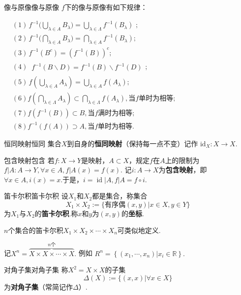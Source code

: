 \documentclass{ctexart}
\begin{document}
	\begin{命题}{像与原像}{像与原像}
		$f$下的像与原像有如下规律：\vspace{5pt}
		
		$\begin{aligned}
			&(1)\,f^{-1}\big(\bigcup_{\lambda\in A}B_\lambda\big)=\bigcup_{\lambda\in\Lambda}f^{-1}(B_\lambda)\text{ ;} \\
			&(2)\,f^{-1}\big(\bigcap_{\lambda\in A}B_\lambda\big)=\bigcap_{\lambda\in A}f^{-1}(B_\lambda); \\
			&(3)\,f^{-1}(B^{c})=(f^{-1}(B))^{c}; \\
			&(4)\,\begin{aligned}f^{-1}(B\backslash D)=f^{-1}(B)\backslash f^{-1}(D)\end{aligned}; \\
			&(5)\,f(\bigcup_{\lambda\in A}A_\lambda)=\bigcup_{\lambda\in A}f(A_\lambda);\\
			&(6)  f(\bigcap_{\lambda \in \Lambda} A_{\lambda}) \subset \bigcap_{\lambda \in \Lambda} f(A_{\lambda}) , \text{当}  f  \text{单时为相等};\\
			&(7)  f(f^{-1}(B)) \subset B , \text{当}  f  \text{满时为相等};\\
			&(8)  f^{-1}(f(A)) \supset A , \text{当}  f  \text{单时为相等}.
		\end{aligned}$
		
	\end{命题}
	\begin{定义}{恒同映射}{恒同}
		集合$X$到自身的\textbf{恒同映射}（保持每一点不变）记作 $\text{id}_X : X \rightarrow X.$
	\end{定义}
	\begin{定义}{包含映射}{包含}
		若$f:X \rightarrow Y$是映射，$A \subset X$，规定$f$在$A$上的限制为$f|A:A\to Y,\forall x\in A,f|A(x)=f(x). $ 记$i: A \rightarrow X$为\textbf{包含映射}，即$\forall x\in A,i(x)=x.$于是，$i=\operatorname{id}|A,f|A=f\circ i.$
	\end{定义}
	\begin{定义}{笛卡尔积}{笛卡尔积}
		设$X_1$和$X_2$都是集合，称集合
		$$X_1\times X_2:=\{\text{有序偶}(x,y)|x\in X,y\in Y\}$$
		为$X_1$与$X_2$的\textbf{笛卡尔积}.称$x$和$y$为$(x,y)$的\textbf{坐标}.
		
		$n$个集合的笛卡尔积$X_{1}\times X_{2}\times\cdots\times X_{n}$可类似地定义.
		
		记$X^{n}=\overbrace{X\times X\times\cdots\times X}^{n\text{个}}.$
		例如 $R^{n}=  \left\lbrace  ( x_1,\cdots,x_n )|x_i\in \mathbb{R}\right\rbrace  .$
	\end{定义} 
	\begin{定义}{对角子集}{对角子集}
		称$X^2 = X \times X$的子集$$
		\Delta(X):=\{(x,x)|\forall x\in X\}
		$$为\textbf{对角子集}（常简记作$\Delta$）.
	\end{定义}
\end{document}
